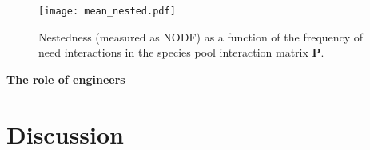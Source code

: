 \documentclass[twocolumn,preprintnumbers,amsmath,amssymb,superscriptaddress]{revtex4}
\begin{document}
\begin{figure}
\centering
\texttt{[image: mean\_nested.pdf]}
\caption{
Nestedness (measured as NODF) as a function of the frequency of need interactions in the species pool interaction matrix $\bm P$.
}
\label{fig:nest}
\end{figure} 

\noindent \textbf{The role of engineers} 

\section*{Discussion}
\end{document}
